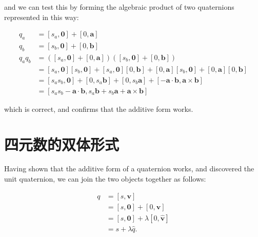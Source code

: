 and we can test this by forming the algebraic product of two quaternions represented in this way:

$$
    \begin{aligned}
        q_{a}       & =\left[s_{a}, \mathbf{0}\right]+[0, \mathbf{a}]                                                                                                                                          \\
        q_{b}       & =\left[s_{b}, \mathbf{0}\right]+[0, \mathbf{b}]                                                                                                                                          \\
        q_{a} q_{b} & =\left(\left[s_{a}, \mathbf{0}\right]+[0, \mathbf{a}]\right)\left(\left[s_{b}, \mathbf{0}\right]+[0, \mathbf{b}]\right)                                                                  \\
                    & =\left[s_{a}, \mathbf{0}\right]\left[s_{b}, \mathbf{0}\right]+\left[s_{a}, \mathbf{0}\right][0, \mathbf{b}]+[0, \mathbf{a}]\left[s_{b}, \mathbf{0}\right]+[0, \mathbf{a}][0, \mathbf{b}] \\
                    & =\left[s_{a} s_{b}, \mathbf{0}\right]+\left[0, s_{a} \mathbf{b}\right]+\left[0, s_{b} \mathbf{a}\right]+[-\mathbf{a} \cdot \mathbf{b}, \mathbf{a} \times \mathbf{b}]                     \\
                    & =\left[s_{a} s_{b}-\mathbf{a} \cdot \mathbf{b}, s_{a} \mathbf{b}+s_{b} \mathbf{a}+\mathbf{a} \times \mathbf{b}\right]
    \end{aligned}
$$

which is correct, and confirms that the additive form works.

\section{四元数的双体形式}
Having shown that the additive form of a quaternion works, and discovered the unit quaternion, we can join the two objects together as follows:

$$
    \begin{aligned}
        q & =[s, \mathbf{v}]                              \\
          & =[s, \mathbf{0}]+[0, \mathbf{v}]              \\
          & =[s, \mathbf{0}]+\lambda[0, \hat{\mathbf{v}}] \\
          & =s+\lambda \hat{q} .
    \end{aligned}
$$

